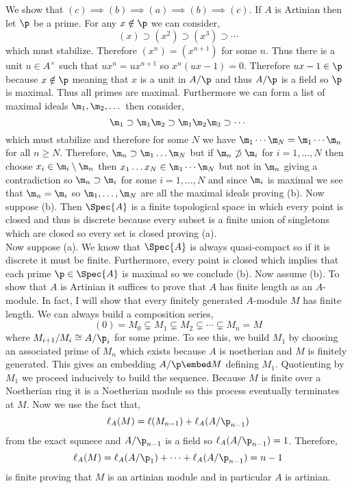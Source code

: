 \documentclass[12pt]{article}
\begin{document}
We show that $(c) \implies (b) \implies (a) \implies (b) \implies (c)$. If $A$ is Artinian then let $\p$ be a prime. For any $x \notin \p$ we can consider,
\[ (x) \supset (x^2) \supset (x^3) \supset \cdots \]
which must stabilize. Therefore $(x^n) = (x^{n+1})$ for some $n$. Thus there is a unit $u \in A^\times$ such that $u x^n = u x^{n+1}$ so $x^n (ux - 1) = 0$. Therefore $ux - 1 \in \p$ because $x \notin \p$ meaning that $x$ is a unit in $A / \p$ and thus $A / \p$ is a field so $\p$ is maximal. Thus all primes are maximal. Furthermore we can form a list of maximal ideals $\m_1, \m_2, \dots$ then consider,
\[ \m_1 \supset \m_1 \m_2 \supset \m_1 \m_2 \m_3 \supset \cdots \]
which must stabilize and therefore for some $N$ we have $\m_1 \cdots \m_N = \m_1 \cdots \m_n$ for all $n \ge N$. Therefore, $\m_n \supset \m_1 \dots \m_N$ but if $\m_n \not\supset \m_i$ for $i = 1, \dots, N$ then choose $x_i \in \m_i \setminus \m_n$ then $x_1 \dots x_N \in \m_1 \cdots \m_N$ but not in $\m_n$ giving a contradiction so $\m_n \supset \m_i$ for some $i = 1, \dots, N$ and since $\m_i$ is maximal we see that $\m_n = \m_i$ so $\m_1, \dots, \m_N$ are all the maximal ideals proving (b). Now suppose (b). Then $\Spec{A}$ is a finite topological space in which every point is closed and thus is discrete because every subset is a finite union of singletons which are closed so every set is closed proving (a). 
\bigskip\\
Now suppose (a). We know that $\Spec{A}$ is always quasi-compact so if it is discrete it must be finite. Furthermore, every point is closed which implies that each prime $\p \in \Spec{A}$ is maximal so we conclude (b). Now assume (b). To show that $A$ is Artinian it suffices to prove that $A$ has finite length as an $A$-module. In fact, I will show that every finitely generated $A$-module $M$ has finite length. We can always build a composition series,
\[ (0) = M_0 \subsetneq M_1 \subsetneq M_2 \subsetneq \cdots \subsetneq M_n = M \]
where $M_{i+1}/M_i \cong A / \p_i$ for some prime. To see this, we build $M_1$ by choosing an associated prime of $M_n$ which exists because $A$ is noetherian and $M$ is finitely generated. This gives an embedding $A/\p \embed M$ defining $M_1$. Quotienting by $M_1$ we proceed inducively to build the sequence. Because $M$ is finite over a Noetherian ring it is a Noetherian module so this process eventually terminates at $M$. Now we use the fact that,
\[ \ell_A(M) = \ell(M_{n-1}) + \ell_A(A / \p_{n-1}) \]
from the exact squnece and $A / \p_{n-1}$ is a field so $\ell_A(A / \p_{n-1}) = 1$. Therefore,
\[ \ell_A(M) = \ell_A(A / \p_1) + \cdots + \ell_A(A / \p_{n-1}) = n - 1 \]
is finite proving that $M$ is an artinian module and in particular $A$ is artinian.
\end{document}
